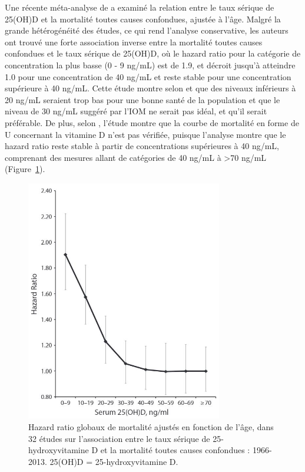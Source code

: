 \documentclass[
  a4paper,
  DIV=11,
  numbers=noendperiod,
  listof=totoc]{scrreprt}
\begin{document}
Une récente méta-analyse de \textcite{Garland.2014} a examiné la
relation entre le taux sérique de 25(OH)D et la mortalité toutes causes
confondues, ajustée à l'âge. Malgré la grande hétérogénéité des études,
ce qui rend l'analyse conservative, les auteurs ont trouvé une forte
association inverse entre la mortalité toutes causes confondues et le
taux sérique de 25(OH)D, où le hazard ratio pour la catégorie de
concentration la plus basse (0 - 9 ng/mL) est de 1.9, et décroit jusqu'à
atteindre 1.0 pour une concentration de 40 ng/mL et reste stable pour
une concentration supérieure à 40 ng/mL. Cette étude montre selon
\textcite{Garland.2014} et \textcite{Papadimitriou.2017} que des niveaux
inférieurs à 20 ng/mL seraient trop bas pour une bonne santé de la
population et que le niveau de 30 ng/mL suggéré par l'IOM ne serait pas
idéal, et qu'il serait préférable. De plus, selon
\textcite{Papadimitriou.2017}, l'étude montre que la courbe de mortalité
en forme de U concernant la vitamine D n'est pas vérifiée, puisque
l'analyse montre que le hazard ratio reste stable à partir de
concentrations supérieures à 40 ng/mL, comprenant des mesures allant de
catégories de 40 ng/mL à \textgreater70 ng/mL
(Figure~\ref{fig-vd-hazard-ratio}).

\begin{figure}

{\centering \includegraphics[width=3.375in,height=\textheight]{figures/vd-hazard-ratio.jpg}

}

\caption{\label{fig-vd-hazard-ratio}Hazard ratio globaux de mortalité
ajustés en fonction de l'âge, dans 32 études sur l'association entre le
taux sérique de 25-hydroxyvitamine D et la mortalité toutes causes
confondues : 1966-2013. 25(OH)D = 25-hydroxyvitamine D.
\textcite{Garland.2014}}

\end{figure}
\end{document}
